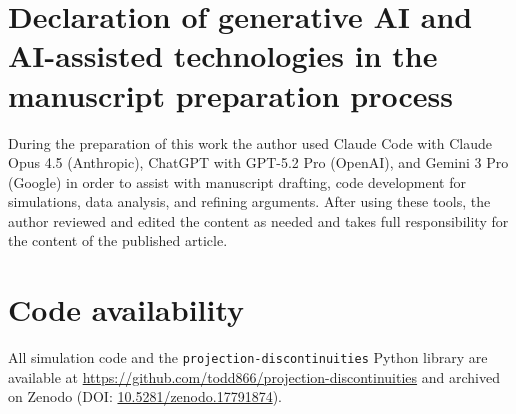 \documentclass[12pt]{article}
\begin{document}
\section*{Declaration of generative AI and AI-assisted technologies in the manuscript preparation process}
During the preparation of this work the author used Claude Code with Claude Opus 4.5 (Anthropic), ChatGPT with GPT-5.2 Pro (OpenAI), and Gemini 3 Pro (Google) in order to assist with manuscript drafting, code development for simulations, data analysis, and refining arguments. After using these tools, the author reviewed and edited the content as needed and takes full responsibility for the content of the published article.

\section*{Code availability}
All simulation code and the \texttt{projection-discontinuities} Python library are available at \url{https://github.com/todd866/projection-discontinuities} and archived on Zenodo (DOI: \href{https://doi.org/10.5281/zenodo.17791874}{10.5281/zenodo.17791874}).
\end{document}

